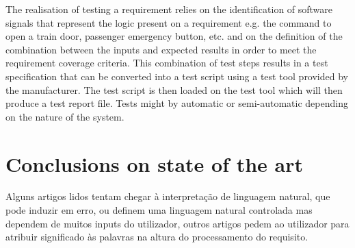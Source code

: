 The realisation of testing a requirement relies on the identification of software signals that represent the logic present on a requirement e.g. the command to open a train door, passenger emergency button, etc. and on the definition of the combination between the inputs and expected results in order to meet the requirement coverage criteria. This combination of test steps results in a test specification that can be converted into a test script using a test tool provided by the manufacturer. The test script is then loaded on the test tool which will then produce a test report file. Tests might by automatic or semi-automatic depending on the nature of the system. 


\section{Conclusions on state of the art}
\label{sec:sota_conclusions}

Alguns artigos lidos tentam chegar à interpretação de linguagem natural, que pode induzir em erro, ou definem uma linguagem natural controlada mas dependem de muitos inputs do utilizador, outros artigos pedem ao utilizador para atribuir significado às palavras na altura do processamento do requisito.

